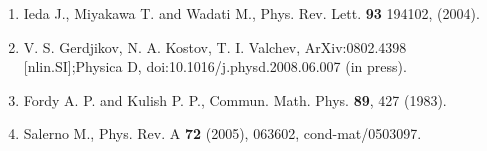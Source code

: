 \vspace{-4mm}

{\normalsize \begin{enumerate}
\item Ieda J., Miyakawa T. and Wadati M., Phys. Rev. Lett. \textbf{93} 194102, (2004).

\item V. S. Gerdjikov, N. A. Kostov, T. I. Valchev,  ArXiv:0802.4398 [nlin.SI];\newline Physica D,
doi:10.1016/j.physd.2008.06.007 (in press).

\item Fordy A. P. and Kulish P. P., Commun. Math. Phys. \textbf{89}, 427 (1983).

\item Salerno M., Phys. Rev. A \textbf{72} (2005), 063602, cond-mat/0503097.
\end{enumerate}
}

\vspace{\baselineskip}